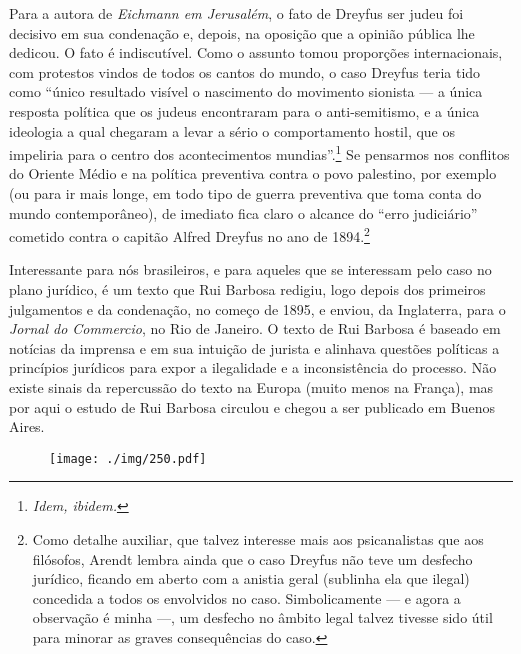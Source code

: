 Para a autora de \textit{Eichmann em Jerusalém}, o fato de Dreyfus ser
judeu foi decisivo em sua condenação e, depois, na oposição que a
opinião pública lhe dedicou. O fato é indiscutível. Como o assunto
tomou proporções internacionais, com protestos vindos de todos os
cantos do mundo, o caso Dreyfus teria tido como “único resultado
visível o nascimento do movimento sionista --- a única resposta política
que os judeus encontraram para o anti-semitismo, e a única ideologia
a qual chegaram a levar a sério o comportamento hostil, que os
impeliria para o centro dos acontecimentos mundias”.\footnote{ \textit{Idem, ibidem.}} 
Se pensarmos nos conflitos do Oriente Médio e na política
preventiva contra o povo palestino, por exemplo (ou para ir mais
longe, em todo tipo de guerra preventiva que toma conta do mundo
contemporâneo), de imediato fica claro o alcance do “erro judiciário”
cometido contra o capitão Alfred Dreyfus no ano de 1894.\footnote{ Como
detalhe auxiliar, que talvez interesse mais aos psicanalistas que aos
filósofos, Arendt lembra ainda que o caso Dreyfus não teve um desfecho
jurídico, ficando em aberto com a anistia geral (sublinha ela que
ilegal) concedida a todos os envolvidos no caso. Simbolicamente --- e
agora a observação é minha ---, um desfecho no âmbito legal talvez tivesse
sido útil para minorar as graves consequências do caso.} 
\asterisc

Interessante para nós brasileiros, e para aqueles que se interessam
pelo caso no plano jurídico, é um texto que Rui Barbosa redigiu, logo
depois dos primeiros julgamentos e da condenação, no começo de 1895, e
enviou, da Inglaterra, para o \textit{Jornal do Commercio}, no Rio de
Janeiro. O texto de Rui Barbosa é baseado em notícias da imprensa e em sua
intuição de jurista e alinhava questões políticas a princípios
jurídicos para expor a ilegalidade e a inconsistência do processo. Não
existe sinais da repercussão do texto na Europa (muito menos na
França), mas por aqui o estudo de Rui Barbosa circulou e chegou a ser
publicado em Buenos Aires.

\begin{figure}
\centering
\texttt{[image: ./img/250.pdf]}
\end{figure}

